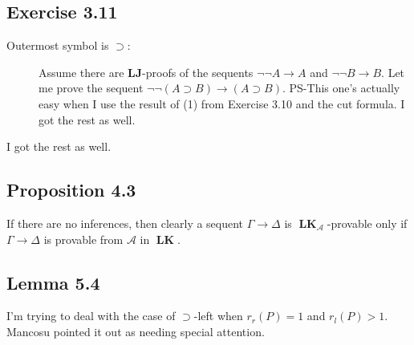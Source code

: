 \documentclass{article}
\DeclareMathOperator{\LK}{\textbf{LK}}
\def\fCenter{\mbox{$\rightarrow$}}
\begin{document}
\subsection{Exercise 3.11}
    \begin{description}
        \item[Outermost symbol is \(\supset\):]
        Assume there are \textbf{LJ}-proofs of the sequents \(\neg\neg A \rightarrow A\)
        and \(\neg \neg B \rightarrow B\).
        Let me prove the sequent \(\neg \neg (A \supset B) \rightarrow (A \supset B)\).
        PS-This one's actually easy when I use the result of (1) from Exercise 3.10 and the cut formula.
        I got the rest as well.
    \end{description}
I got the rest as well.

\subsection{Proposition 4.3}
If there are no inferences, then clearly a sequent \(\Gamma \rightarrow \Delta\) is \(\LK_\mathcal{A}\)-provable
only if \(\Gamma \rightarrow \Delta\) is provable from \(\mathcal{A}\) in \(\LK\).

\subsection{Lemma 5.4}
I'm trying to deal with the case of \(\supset\)-left when  \(r_r(P) = 1\) and \(r_l(P) > 1\). Mancosu pointed it out as needing special attention.
\end{document}

